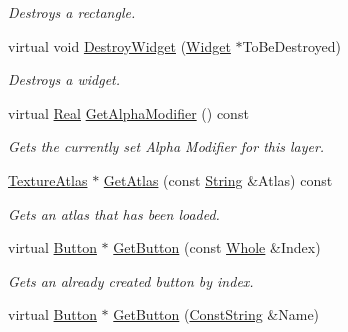 \begin{DoxyCompactItemize}
\begin{DoxyCompactList}\small\item\em Destroys a rectangle. \item\end{DoxyCompactList}\item 
virtual void \hyperlink{classMezzanine_1_1UI_1_1Layer_a249e2ed0a11581932464c576b9f763c1}{DestroyWidget} (\hyperlink{classMezzanine_1_1UI_1_1Widget}{Widget} $\ast$ToBeDestroyed)
\begin{DoxyCompactList}\small\item\em Destroys a widget. \item\end{DoxyCompactList}\item 
virtual \hyperlink{namespaceMezzanine_a726731b1a7df72bf3583e4a97282c6f6}{Real} \hyperlink{classMezzanine_1_1UI_1_1Layer_a74c90d2655358e896d5a56cc4aa2dc92}{GetAlphaModifier} () const 
\begin{DoxyCompactList}\small\item\em Gets the currently set Alpha Modifier for this layer. \item\end{DoxyCompactList}\item 
\hyperlink{classMezzanine_1_1UI_1_1TextureAtlas}{TextureAtlas} $\ast$ \hyperlink{classMezzanine_1_1UI_1_1Layer_a8c57c661bb222a7e7068b268e29493ef}{GetAtlas} (const \hyperlink{namespaceMezzanine_acf9fcc130e6ebf08e3d8491aebcf1c86}{String} \&Atlas) const 
\begin{DoxyCompactList}\small\item\em Gets an atlas that has been loaded. \item\end{DoxyCompactList}\item 
virtual \hyperlink{classMezzanine_1_1UI_1_1Button}{Button} $\ast$ \hyperlink{classMezzanine_1_1UI_1_1Layer_acfbea2afd6cf9a1509d72d39715ebf05}{GetButton} (const \hyperlink{namespaceMezzanine_adcbb6ce6d1eb4379d109e51171e2e493}{Whole} \&Index)
\begin{DoxyCompactList}\small\item\em Gets an already created button by index. \item\end{DoxyCompactList}\item 
virtual \hyperlink{classMezzanine_1_1UI_1_1Button}{Button} $\ast$ \hyperlink{classMezzanine_1_1UI_1_1Layer_a35636ea8bbb02c7cbd7236db3ad48a7e}{GetButton} (\hyperlink{namespaceMezzanine_a63cd699ac54b73953f35ec9cfc05e506}{ConstString} \&Name)

\end{DoxyCompactItemize}
